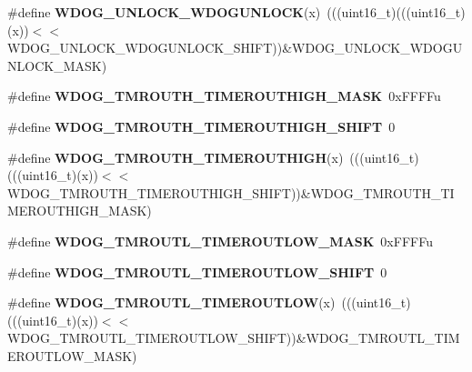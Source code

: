 \begin{DoxyCompactItemize}
\item 
\#define {\bfseries W\+D\+O\+G\+\_\+\+U\+N\+L\+O\+C\+K\+\_\+\+W\+D\+O\+G\+U\+N\+L\+O\+CK}(x)~(((uint16\+\_\+t)(((uint16\+\_\+t)(x))$<$$<$W\+D\+O\+G\+\_\+\+U\+N\+L\+O\+C\+K\+\_\+\+W\+D\+O\+G\+U\+N\+L\+O\+C\+K\+\_\+\+S\+H\+I\+FT))\&W\+D\+O\+G\+\_\+\+U\+N\+L\+O\+C\+K\+\_\+\+W\+D\+O\+G\+U\+N\+L\+O\+C\+K\+\_\+\+M\+A\+SK)\hypertarget{group__WDOG__Register__Masks_gad96dca67e74ad54ec68edec38214cbc6}{}\label{group__WDOG__Register__Masks_gad96dca67e74ad54ec68edec38214cbc6}

\item 
\#define {\bfseries W\+D\+O\+G\+\_\+\+T\+M\+R\+O\+U\+T\+H\+\_\+\+T\+I\+M\+E\+R\+O\+U\+T\+H\+I\+G\+H\+\_\+\+M\+A\+SK}~0x\+F\+F\+F\+Fu\hypertarget{group__WDOG__Register__Masks_ga4c46affdc0cd5ed2cde734812f783d31}{}\label{group__WDOG__Register__Masks_ga4c46affdc0cd5ed2cde734812f783d31}

\item 
\#define {\bfseries W\+D\+O\+G\+\_\+\+T\+M\+R\+O\+U\+T\+H\+\_\+\+T\+I\+M\+E\+R\+O\+U\+T\+H\+I\+G\+H\+\_\+\+S\+H\+I\+FT}~0\hypertarget{group__WDOG__Register__Masks_ga6565e44e33822cee4835856bfb88431e}{}\label{group__WDOG__Register__Masks_ga6565e44e33822cee4835856bfb88431e}

\item 
\#define {\bfseries W\+D\+O\+G\+\_\+\+T\+M\+R\+O\+U\+T\+H\+\_\+\+T\+I\+M\+E\+R\+O\+U\+T\+H\+I\+GH}(x)~(((uint16\+\_\+t)(((uint16\+\_\+t)(x))$<$$<$W\+D\+O\+G\+\_\+\+T\+M\+R\+O\+U\+T\+H\+\_\+\+T\+I\+M\+E\+R\+O\+U\+T\+H\+I\+G\+H\+\_\+\+S\+H\+I\+FT))\&W\+D\+O\+G\+\_\+\+T\+M\+R\+O\+U\+T\+H\+\_\+\+T\+I\+M\+E\+R\+O\+U\+T\+H\+I\+G\+H\+\_\+\+M\+A\+SK)\hypertarget{group__WDOG__Register__Masks_ga6d47e0fbb5b3a15c1bec6418031960a0}{}\label{group__WDOG__Register__Masks_ga6d47e0fbb5b3a15c1bec6418031960a0}

\item 
\#define {\bfseries W\+D\+O\+G\+\_\+\+T\+M\+R\+O\+U\+T\+L\+\_\+\+T\+I\+M\+E\+R\+O\+U\+T\+L\+O\+W\+\_\+\+M\+A\+SK}~0x\+F\+F\+F\+Fu\hypertarget{group__WDOG__Register__Masks_gaf33faad844e2af36af7af5c6bf49a361}{}\label{group__WDOG__Register__Masks_gaf33faad844e2af36af7af5c6bf49a361}

\item 
\#define {\bfseries W\+D\+O\+G\+\_\+\+T\+M\+R\+O\+U\+T\+L\+\_\+\+T\+I\+M\+E\+R\+O\+U\+T\+L\+O\+W\+\_\+\+S\+H\+I\+FT}~0\hypertarget{group__WDOG__Register__Masks_gae4a9f52d3b15e28932d287dee4128e8a}{}\label{group__WDOG__Register__Masks_gae4a9f52d3b15e28932d287dee4128e8a}

\item 
\#define {\bfseries W\+D\+O\+G\+\_\+\+T\+M\+R\+O\+U\+T\+L\+\_\+\+T\+I\+M\+E\+R\+O\+U\+T\+L\+OW}(x)~(((uint16\+\_\+t)(((uint16\+\_\+t)(x))$<$$<$W\+D\+O\+G\+\_\+\+T\+M\+R\+O\+U\+T\+L\+\_\+\+T\+I\+M\+E\+R\+O\+U\+T\+L\+O\+W\+\_\+\+S\+H\+I\+FT))\&W\+D\+O\+G\+\_\+\+T\+M\+R\+O\+U\+T\+L\+\_\+\+T\+I\+M\+E\+R\+O\+U\+T\+L\+O\+W\+\_\+\+M\+A\+SK)\hypertarget{group__WDOG__Register__Masks_gac3d8acaa47ae35b724e29dcd0ed62ac3}{}\label{group__WDOG__Register__Masks_gac3d8acaa47ae35b724e29dcd0ed62ac3}


\end{DoxyCompactItemize}
